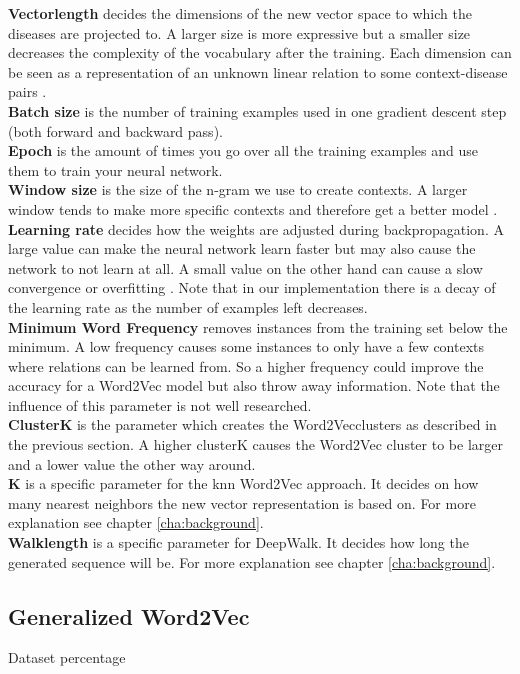 \noindent\textbf{Vectorlength} decides the dimensions of the new vector space to which the diseases are projected to. A larger size is more expressive but a smaller size decreases the complexity of the vocabulary after the training. Each dimension can be seen as a representation of an unknown linear relation to some context-disease pairs \cite{vl:article}. \\
\textbf{Batch size} is the number of training examples used in one gradient descent step (both forward and backward pass). \\
\textbf{Epoch} is the amount of times you go over all the training examples and use them to train your neural network. \\
\textbf{Window size} is the size of the n-gram we use to create contexts. A larger window tends to make more specific contexts and therefore get a better model \cite{w2vOriginal:article} \cite{windowSize:article}. \\
\textbf{Learning rate} decides how the weights are adjusted during backpropagation. A large value can make the neural network learn faster but may also cause the network to not learn at all. A small value on the other hand can cause a slow convergence or overfitting \cite{lr:article}. Note that in our implementation there is a decay of the learning rate as the number of examples left decreases. \\
\textbf{Minimum Word Frequency} removes instances from the training set below the minimum. A low frequency causes some instances to only have a few contexts where relations can be learned from. So a higher frequency could improve the accuracy for a Word2Vec model but also throw away information. Note that the influence of this parameter is not well researched. \\
\textbf{ClusterK} is the parameter which creates the Word2Vecclusters as described in the previous section. A higher clusterK causes the Word2Vec cluster to be larger and a lower value the other way around. \\
\textbf{K} is a specific parameter for the knn Word2Vec approach. It decides on how many nearest neighbors the new vector representation is based on. For more explanation see chapter \ref{cha:background}. \\
\textbf{Walklength} is a specific parameter for DeepWalk. It decides how long the generated sequence will be. For more explanation see chapter \ref{cha:background}. \\


\subsection{Generalized Word2Vec}
Dataset percentage

